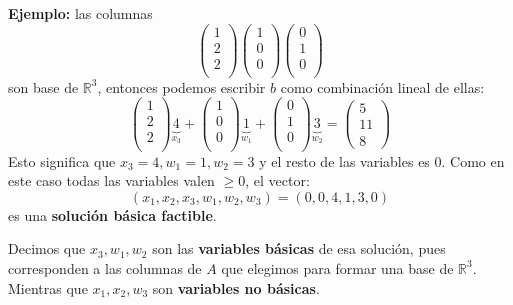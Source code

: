 \documentclass[10pt, aspectratio=169]{beamer}
\begin{document}
    \begin{frame}
        \textbf{Ejemplo:} las columnas
        \[
        \begin{pmatrix}
            1 \\
            2 \\
            2 \\
        \end{pmatrix}
        \begin{pmatrix}
            1 \\
            0 \\
            0 \\
        \end{pmatrix}
        \begin{pmatrix}
            0 \\
            1 \\
            0 \\
        \end{pmatrix}
        \]
        son base de $\mathbb{R}^3$, entonces podemos escribir $b$ como combinación lineal de ellas:
        \pause
        \[
        \begin{pmatrix}
            1 \\
            2 \\
            2 \\
        \end{pmatrix} \underbrace{4}_{x_3} +
        \begin{pmatrix}
            1 \\
            0 \\
            0 \\
        \end{pmatrix} \underbrace{1}_{w_1} +
        \begin{pmatrix}
            0 \\
            1 \\
            0 \\
        \end{pmatrix} \underbrace{3}_{w_2} =
        \begin{pmatrix}
                5 \\
                11 \\
                8
        \end{pmatrix}
        \]
        Esto significa que $x_3=4,w_1=1,w_2=3$ y el resto de las variables es $0$. Como en este caso todas las
        variables valen $\geq 0$, el vector:
        \[(x_1,x_2,x_3,w_1,w_2,w_3)=(0,0,4,1,3,0)\]
        es una \textbf{solución básica factible}. \pause

        Decimos que $x_3,w_1,w_2$ son las \textbf{variables básicas} de esa solución, pues corresponden a las
        columnas de $A$ que elegimos para formar una base de $\mathbb{R}^3$. Mientras
        que $x_1,x_2,w_3$ son
        \textbf{variables no básicas}.
    \end{frame}
\end{document}

